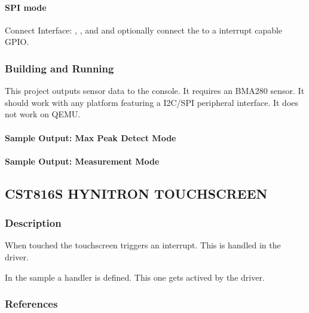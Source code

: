 \documentclass[letterpaper,10pt,english]{sphinxmanual}
\begin{document}
\paragraph{SPI mode}
\label{\detokenize{samples/sensor/bma280/README:spi-mode}}
Connect Interface: , ,  and  and optionally
connect the  to a interrupt capable GPIO.


\subsubsection{Building and Running}
\label{\detokenize{samples/sensor/bma280/README:building-and-running}}
This project outputs sensor data to the console. It requires an BMA280
sensor. It should work with any platform featuring a I2C/SPI peripheral interface.
It does not work on QEMU.


\paragraph{Sample Output: Max Peak Detect Mode}
\label{\detokenize{samples/sensor/bma280/README:sample-output-max-peak-detect-mode}}

\paragraph{Sample Output: Measurement Mode}
\label{\detokenize{samples/sensor/bma280/README:sample-output-measurement-mode}}

\subsection{CST816S HYNITRON TOUCHSCREEN}
\label{\detokenize{samples/sensor/cst816s/README:cst816s-hynitron-touchscreen}}\label{\detokenize{samples/sensor/cst816s/README:cst816s}}\label{\detokenize{samples/sensor/cst816s/README::doc}}

\subsubsection{Description}
\label{\detokenize{samples/sensor/cst816s/README:description}}
When touched the touchscreen triggers an interrupt.
This is handled in the driver.

In the sample a handler is defined.
This one gets actived by the driver.


\subsubsection{References}
\label{\detokenize{samples/sensor/cst816s/README:references}}
\end{document}
